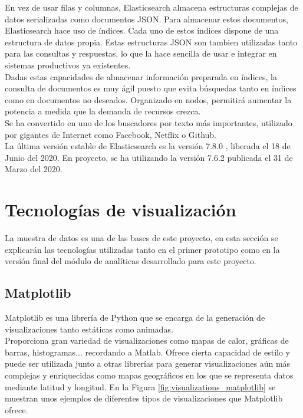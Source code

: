 \documentclass[a4paper, 12pt]{book}
\begin{document}
		En vez de usar filas y columnas, Elasticsearch almacena estructuras complejas de datos serializadas como documentos JSON. Para almacenar estos documentos, Elasticsearch hace uso de índices. Cada uno de estos índices dispone de una estructura de datos propia. Estas estructuras JSON son tambien utilizadas tanto para las consultas y respuestas, lo que la hace sencilla de usar e integrar en sistemas productivos ya existentes.\\
		
		Dadas estas capacidades de almacenar información preparada en índices, la consulta de documentos es muy ágil puesto que evita búsquedas tanto en índices como en documentos no deseados. Organizado en nodos, permitirá aumentar la potencia a medida que la demanda de recursos crezca. \\
		
		Se ha convertido en uno de los buscadores por texto más importantes, utilizado por gigantes de Internet como Facebook, Netflix o Github. \\
		
		La última versión estable de Elasticsearch es la versión 7.8.0 \cite{versions_elasticsearch}, liberada el 18 de Junio del 2020. En proyecto, se ha utilizando la versión 7.6.2 publicada el 31 de Marzo del 2020.
		
	
	\section{Tecnologías de visualización} 
	\label{sec:tecnologias_visualizacion} 
		La muestra de datos es una de las bases de este proyecto, en esta sección se explicarán las tecnologías utilizadas tanto en el primer prototipo como en la versión final del módulo de analíticas desarrollado para este proyecto.
		
	\subsection{Matplotlib}
	\label{subsec:matplotlib}
		Matplotlib es una librería de Python que se encarga de la generación de visualizaciones tanto estáticas como animadas. \\
		
		Proporciona gran variedad de visualizaciones como mapas de calor, gráficas de barras, histogramas... recordando a Matlab. Ofrece cierta capacidad de estilo y puede ser utilizada junto a otras librerías para generar visualizaciones aún más complejas y enriquecidas como mapas geográficos en los que se representa datos mediante latitud y longitud. En la Figura \ref{fig:visualizations_matplotlib} se muestran unos ejemplos de diferentes tipos de visualizaciones que Matplotlib ofrece.
		
\end{document}
